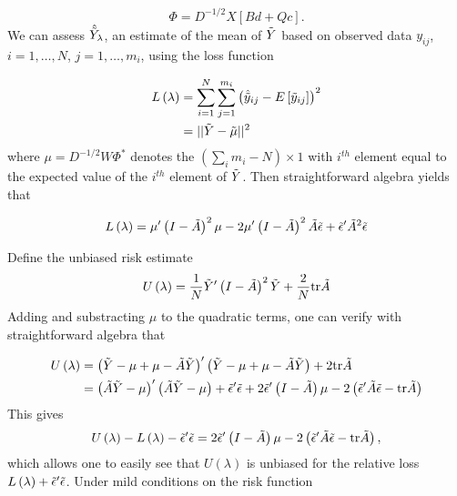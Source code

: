 \documentclass[../chapter-2-spline-representation.tex]{subfiles}
\begin{document}
\begin{equation} 
\Phi = D^{-1/2} X \left[ Bd + Qc \right].
\end{equation}
\noindent
We can assess $\hat{\tilde{Y}}_\lambda$, an estimate of the mean of $\tilde{Y}$ based on observed data $y_{ij}$, $i = 1,\dots, N$, $j = 1,\dots, m_i$, using the loss function

\begin{align}
\begin{split}
L\left(\lambda\right) &= \sum_{i = 1}^N \sum_{j = 1}^{m_i} \left(\hat{\tilde{y}}_{ij} - E\left[\tilde{y}_{ij}\right] \right)^2\\
&= \vert \vert \tilde{Y} - \tilde{\mu} \vert \vert^2
\end{split}
\end{align}
\noindent
where $\mu = D^{-1/2}W \Phi^*$ denotes the $\left( \sum \limits_{i} m_i - N\right) \times 1$ with $i^{th}$ element equal to the expected value of the  $i^{th}$ element of $\tilde{Y}$.  Then straightforward algebra yields that 

\begin{align} 
L\left(\lambda\right) = \mu'\left( I - \tilde{A} \right)^2\mu - 2\mu'\left( I - \tilde{A} \right)^2 \tilde{A} \tilde{\epsilon} + \tilde{\epsilon}' \tilde{A}^2 \tilde{\epsilon}
\end{align}

Define the unbiased risk estimate
\begin{equation} 
U\left(\lambda\right) = \frac{1}{N}\tilde{Y}'\left( I - \tilde{A} \right)^2\tilde{Y} + \frac{2}{N}\mbox{tr}\tilde{A}
\end{equation}
 \noindent
Adding and substracting $\mu$ to the quadratic terms, one can verify with straightforward algebra that

\begin{align}
\begin{split}
U\left(\lambda\right) &= \left( \tilde{Y} - \mu + \mu - \tilde{A} \tilde{Y} \right)'\left( \tilde{Y} - \mu + \mu - \tilde{A} \tilde{Y} \right) + 2\mbox{tr}\tilde{A} \\
&= \left(\tilde{A} \tilde{Y} - \mu \right)'\left( \tilde{A} \tilde{Y} - \mu \right) + \tilde{\epsilon}'\tilde{\epsilon} + 2\tilde{\epsilon}' \left( I- \tilde{A}\right)\mu- 2\left( \tilde{\epsilon}'\tilde{A} \tilde{\epsilon} -  \mbox{tr}\tilde{A}\right)
\end{split}
\end{align}
\noindent
This gives
\begin{equation} 
U\left(\lambda\right) - L\left(\lambda\right) - \tilde{\epsilon}'\tilde{\epsilon}  =  2\tilde{\epsilon}' \left( I- \tilde{A}\right)\mu- 2\left( \tilde{\epsilon}'\tilde{A} \tilde{\epsilon} -  \mbox{tr}\tilde{A}\right), 
\end{equation}
 \noindent
 which allows one to easily see that $U\left(\lambda\right)$ is unbiased for the relative loss $L\left(\lambda\right) + \tilde{\epsilon}'\tilde{\epsilon}$.  Under mild conditions on the risk function
 
\end{document}
